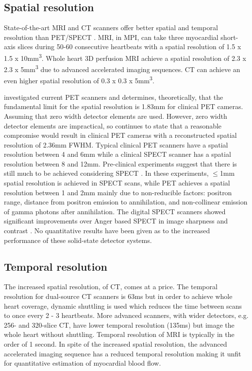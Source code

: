 \subsection*{Spatial resolution}
State-of-the-art \ac{MRI} and \ac{CT} scanners offer better spatial and temporal resolution than \ac{PET}/\ac{SPECT} \citep{pelgrim2016quantitative, khalil2011molecular}. \ac{MRI}, in \acl{MPI}, can take three myocardial short-axis slices during 50-60 consecutive heartbeats with a spatial resolution of 1.5 x 1.5 x 10mm\textsuperscript{3}. Whole heart 3D perfusion MRI achieve a spatial resolution of 2.3 x 2.3 x 5mm\textsuperscript{3} due to advanced accelerated imaging sequences. \ac{CT} can achieve an even higher spatial resolution of 0.3 x 0.3 x 5mm\textsuperscript{3}.

\cite{moses2011fundamental} investigated current \ac{PET} scanners and determines, theoretically, that the fundamental  limit for the spatial resolution is 1.83mm for clinical PET cameras. Assuming that zero width detector elements are used. However, zero width detector elements are impractical, so \cite{moses2011fundamental} continues to state that a reasonable compromise would result in clinical PET cameras with a reconstructed spatial resolution of 2.36mm \ac{FWHM}. Typical clinical \ac{PET} scanners have a spatial resolution between 4 and 6mm while a clinical \ac{SPECT} scanner has a spatial resolution between 8 and 12mm. Pre-clinical experiments suggest that  there is still much to be achieved considering \ac{SPECT} \citep{khalil2011molecular}. In these experiments, $\leq$1mm spatial resolution is achieved in \ac{SPECT} scans, while \ac{PET} achieves a spatial resolution between 1 and 2mm mainly due to  non-reducible factors: positron range, distance from positron emission to annihilation, and non-collinear emission of gamma photons after annihilation. The digital \ac{SPECT} scanners showed significant improvements over Anger based \ac{SPECT} in image sharpness and contrast \cite{goshen2018feasibility, gambhir2009novel}. No quantitative results have been given as to the increased performance of these solid-state detector systems.

\subsection*{Temporal resolution}
The increased spatial resolution, of \ac{CT}, comes at a price. The temporal resolution for dual-source \ac{CT} scanners is 63ms but in order to achieve whole heart coverage, dynamic shuttling is used which reduces the time between scans to once every 2 - 3 heartbeats. More advanced scanners, with wider detectors, e.g. 256- and 320-slice \ac{CT}, have lower temporal resolution (135ms) but image the whole heart without shuttling. Temporal resolution of \ac{MRI} is typically in the order of 1 second. In spite of the increased spatial resolution, the advanced accelerated imaging sequence has a reduced temporal resolution making it unfit for quantitative estimation of myocardial blood flow\citep{pelgrim2016quantitative}.

